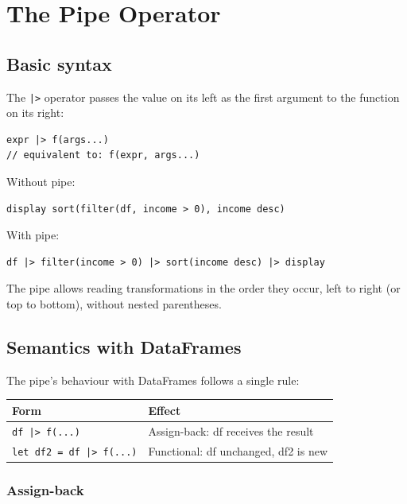 \chapter{The Pipe Operator}
\label{cap:pipes}

\section{Basic syntax}

The \lstinline{|>} operator passes the value on its left as the first
argument to the function on its right:

\begin{lstlisting}
expr |> f(args...)
// equivalent to: f(expr, args...)
\end{lstlisting}

Without pipe:
\begin{lstlisting}
display sort(filter(df, income > 0), income desc)
\end{lstlisting}

With pipe:
\begin{lstlisting}
df |> filter(income > 0) |> sort(income desc) |> display
\end{lstlisting}

The pipe allows reading transformations in the order they occur, left to
right (or top to bottom), without nested parentheses.

\section{Semantics with DataFrames}

The pipe's behaviour with DataFrames follows a single rule:

\begin{center}
\begin{tabular}{ll}
\toprule
\textbf{Form} & \textbf{Effect} \\
\midrule
\texttt{df |> f(...)}           & Assign-back: df receives the result \\
\texttt{let df2 = df |> f(...)} & Functional: df unchanged, df2 is new \\
\bottomrule
\end{tabular}
\end{center}

\subsection*{Assign-back}

